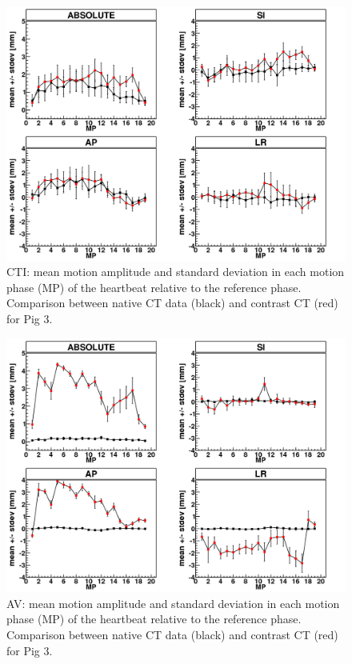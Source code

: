 \vspace*{-0.8cm}

\begin{figure}[H]
\begin{center}
 \includegraphics[scale=0.22]{./teile/results_porcine/Mayo_CTI_HB_NATIV_VS_CONTRAST.png}
\caption{CTI: mean motion amplitude and standard deviation in each motion phase (MP) of the heartbeat relative to the reference phase. 
Comparison between native CT data (black) and contrast CT (red) for Pig 3.}
\label{motion_hb_cti_contrast_native}
\end{center}
\end{figure}

\newpage


\begin{figure}[H]
\begin{center}
 \includegraphics[scale=0.22]{./teile/results_porcine/Mayo_AV_HB_NATIV_VS_CONTRAST.png}
\caption{AV: mean motion amplitude and standard deviation in each motion phase (MP) of the heartbeat relative to the reference phase. 
Comparison between native CT data (black) and contrast CT (red) for Pig 3.}
\label{motion_hb_av_contrast_native}
\end{center}
\end{figure}


